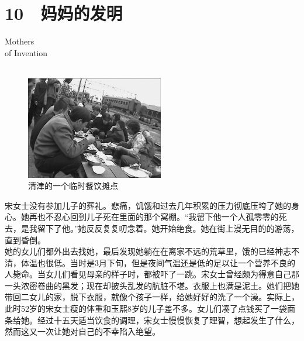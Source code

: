 \fancyhead[RO]{{\tiny{\textcolor{Gray}{\FA \ }}}\thepage}
\fancyhead[LE]{{\tiny{\textcolor{Gray}{\FA \ }}}\thepage}
\fancyfoot[LE,RO]{}
\fancyfoot[LO,CE]{}
\fancyfoot[CO,RE]{}
\chapter*{10 {\FA } 妈妈的发明}
\vspace{5mm}
\begin{flushright}
	\textcolor{PinYinColor}{\EN \huge{Mothers\\
	of Invention\\
	\ \\}}
\end{flushright}
\begin{figure}[!htbp]
	\centering
	\includegraphics[width=6cm]{./Chapters/Images/10.jpg}
	\caption*{清津的一个临时餐饮摊点}
\end{figure}


宋女士没有参加儿子的葬礼。悲痛，饥饿和过去几年积累的压力彻底压垮了她的身心。她再也不忍心回到儿子死在里面的那个窝棚。“我留下他一个人孤零零的死去，是我留下了他。”她反反复复叨念着。她开始绝食。她在街上漫无目的的游荡，直到昏倒。\\

她的女儿们都外出去找她，最后发现她躺在在离家不远的荒草里，饿的已经神志不清，体温也很低。当时是3月下旬，但是夜间气温还是低的足以让一个营养不良的人毙命。当女儿们看见母亲的样子时，都被吓了一跳。宋女士曾经颇为得意自己那一头浓密卷曲的黑发；现在却披头乱发的肮脏不堪。衣服上也满是泥土。她们把她带回二女儿的家，脱下衣服，就像个孩子一样，给她好好的洗了一个澡。实际上，此时52岁的宋女士瘦的体重和玉熙8岁的儿子差不多。女儿们凑了点钱买了一袋面条给她。经过十五天适当饮食的调理，宋女士慢慢恢复了理智，想起发生了什么，然而这又一次让她对自己的不幸陷入绝望。\\

